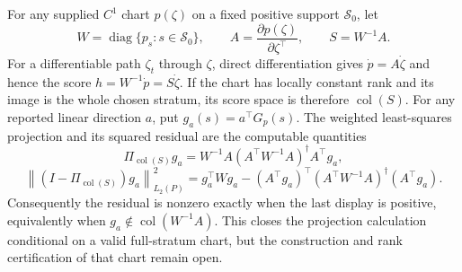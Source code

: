 For any supplied \(C^1\) chart \(p(\zeta)\) on a fixed positive support \(\mathcal S_0\), let
\[
 W=\operatorname{diag}\{p_s:s\in\mathcal S_0\},\qquad
 A=\frac{\partial p(\zeta)}{\partial\zeta^\top},\qquad
 S=W^{-1}A.
\]
For a differentiable path \(\zeta_t\) through \(\zeta\), direct differentiation gives \(\dot p=A\dot\zeta\) and hence the score \(h=W^{-1}\dot p=S\dot\zeta\). If the chart has locally constant rank and its image is the whole chosen stratum, its score space is therefore \(\operatorname{col}(S)\). For any reported linear direction \(a\), put \(g_a(s)=a^\top G_p(s)\). The weighted least-squares projection and its squared residual are the computable quantities
\[
 \Pi_{\operatorname{col}(S)}g_a
 =W^{-1}A(A^\top W^{-1}A)^\dagger A^\top g_a,
\]
\[
 \left\|(I-\Pi_{\operatorname{col}(S)})g_a\right\|_{L_2(P)}^2
 =g_a^\top Wg_a-(A^\top g_a)^\top(A^\top W^{-1}A)^\dagger(A^\top g_a).
\]
Consequently the residual is nonzero exactly when the last display is positive, equivalently when \(g_a\notin\operatorname{col}(W^{-1}A)\). This closes the projection calculation conditional on a valid full-stratum chart, but the construction and rank certification of that chart remain open.
